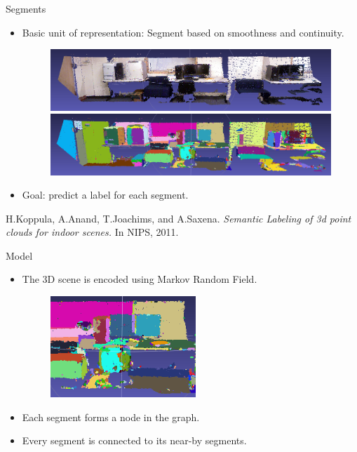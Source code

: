 \documentclass{beamer}
\begin{document}
\begin{frame}{Segments}
	\begin{itemize}
		\item Basic unit of representation: Segment based on smoothness and continuity. 
		\begin{figure}
		       \includegraphics[width=.9\linewidth]{mengo.png}\\
		       \includegraphics[width=.9\linewidth]{meng_segmented.png}
	         \end{figure}
		\item Goal: predict a label for each segment.
	\end{itemize}
	
	\vskip 0.25in
{\scriptsize
 H.Koppula, A.Anand, T.Joachims, and A.Saxena. \emph{Semantic Labeling of 3d point clouds for indoor scenes.} In NIPS, 2011.\\
}
\end{frame}


\begin{frame}{Model}
\begin{itemize}
 \item The 3D scene is encoded using Markov Random Field.
 \begin{figure}
 \includegraphics[width=.8\linewidth,height=1.5in]{segments_graph.png}
 \end{figure}  
 \item Each segment forms a node in the graph.
 \item Every segment is connected to its near-by segments.
\end{itemize}
\end{frame}
\end{document}
